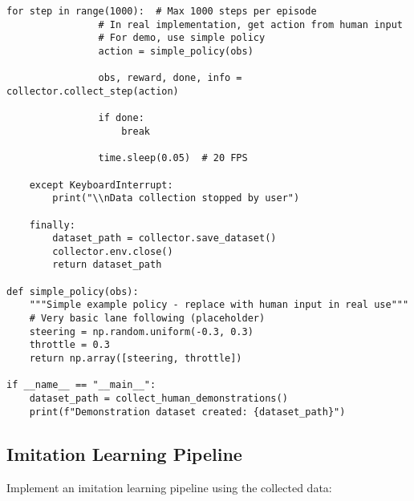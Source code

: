 \documentclass[11pt,a4paper]{article}
\begin{document}
\begin{lstlisting}[style=pythonstyle, caption={Data collection for LeRobot (collect\_demonstrations.py)}]
            for step in range(1000):  # Max 1000 steps per episode
                # In real implementation, get action from human input
                # For demo, use simple policy
                action = simple_policy(obs)
                
                obs, reward, done, info = collector.collect_step(action)
                
                if done:
                    break
                    
                time.sleep(0.05)  # 20 FPS
    
    except KeyboardInterrupt:
        print("\\nData collection stopped by user")
    
    finally:
        dataset_path = collector.save_dataset()
        collector.env.close()
        return dataset_path

def simple_policy(obs):
    """Simple example policy - replace with human input in real use"""
    # Very basic lane following (placeholder)
    steering = np.random.uniform(-0.3, 0.3)
    throttle = 0.3
    return np.array([steering, throttle])

if __name__ == "__main__":
    dataset_path = collect_human_demonstrations()
    print(f"Demonstration dataset created: {dataset_path}")
\end{lstlisting}

\subsection{Imitation Learning Pipeline}

Implement an imitation learning pipeline using the collected data:
\end{document}
